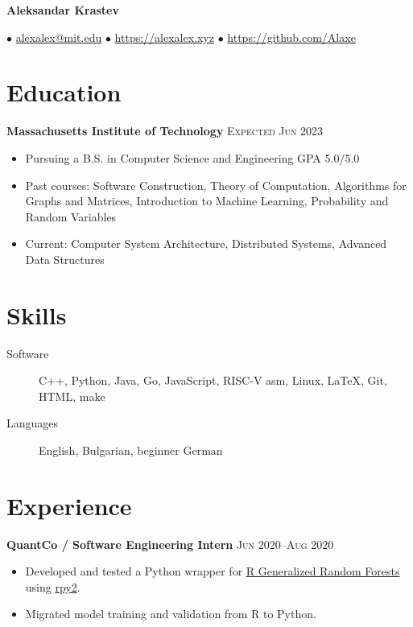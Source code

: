 \documentclass[letterpaper,11pt]{article}
\author{Aleksandar Krastev}
\date{2020-12-21}
\begin{document}
\setlength{\belowdisplayskip}{\parskip}
\setlength{\belowdisplayshortskip}{\belowdisplayskip}
\setlength{\abovedisplayskip}{\parskip}
\setlength{\abovedisplayshortskip}{\abovedisplayskip}



\centerline{{\Huge \bf Aleksandar Krastev}}
$\bullet$ \href{mailto:alexalex@mit.edu}{alexalex@mit.edu} \hfill
$\bullet$ \href{https://alexalex.xyz}{https://alexalex.xyz} \hfill
$\bullet$ \href{https://github.com/Alaxe}{https://github.com/Alaxe} \hfill

\section*{Education}
\textbf{Massachusetts Institute of Technology}
\hfill
\textsc{Expected Jun 2023}

\begin{itemize}
    \item Pursuing a B.S. in Computer Science and Engineering
        \hfill GPA 5.0/5.0
    \item Past courses:
        Software Construction,
        Theory of Computation,
        Algorithms for Graphs and Matrices,
        Introduction to Machine Learning,
        Probability and Random Variables
    \item Current:
        Computer System Architecture,
        Distributed Systems,
        Advanced Data Structures
\end{itemize}

\section*{Skills}
\begin{description}
    \item[Software] C++, Python, Java, Go, JavaScript, RISC-V asm, Linux, LaTeX, Git,
        HTML, make
    \item[Languages] English, Bulgarian, beginner German
\end{description}

\section*{Experience}
\textbf{QuantCo / Software Engineering Intern}
\hfill
\textsc{Jun 2020--Aug 2020}
\begin{itemize}
    \item Developed and tested a Python wrapper for
        \href{https://grf-labs.github.io/}{R Generalized Random Forests} using
        \href{https://rpy2.github.io/}{rpy2}.
    \item Migrated model training and validation from R to Python.
\end{itemize}
\end{document}
